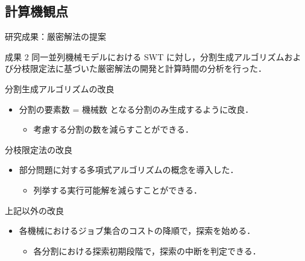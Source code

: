 \documentclass[dvipdfmx]{beamer}
\begin{document}
    \subsection{計算機観点}
    \begin{frame}{研究成果：厳密解法の提案}
      \begin{alertblock}{成果 2}
        同一並列機械モデルにおける SWT に対し，分割生成アルゴリズムおよび分枝限定法に基づいた厳密解法の開発と計算時間の分析を行った．
      \end{alertblock}
      \begin{block}{分割生成アルゴリズムの改良}
        \begin{itemize}
          \item \alert{分割の要素数 = 機械数} となる分割のみ生成するように改良．
          \begin{itemize}
            \item 考慮する分割の数を減らすことができる．
          \end{itemize}
        \end{itemize}
      \end{block}
      \begin{block}{分枝限定法の改良}
        \begin{itemize}
          \item \alert{部分問題に対する多項式アルゴリズム}の概念を導入した．
          \begin{itemize}
            \item 列挙する実行可能解を減らすことができる．
          \end{itemize}
        \end{itemize}
      \end{block}
      \begin{block}{上記以外の改良}
        \begin{itemize}
          \item 各機械におけるジョブ集合のコストの降順で，探索を始める．
          \begin{itemize}
            \item 各分割における探索初期段階で，探索の中断を判定できる．
          \end{itemize}
        \end{itemize}
      \end{block}
    \end{frame}
\end{document}
